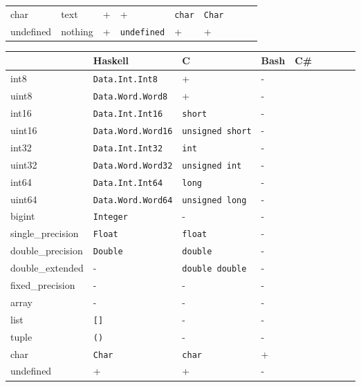 \documentclass[../main]{subfiles}
\begin{document}
\begin{table}
\begin{wide}
\begin{tabular}{|l|l|l|l|l|l|l|l|l|}
            char & text & + & + & \texttt{char} & \texttt{Char} \\
            undefined & nothing & + & \texttt{undefined} & + & + \\
            \hline
        \end{tabular}
        \begin{tabular}{|l|l|l|l|l|l|l|l|l|}
            \hline
            \tested{}         & Haskell                   & C                        & Bash & C\# \\
            \hline
            int8              & \texttt{Data.Int.Int8}    & +                        & -    & \\
            uint8             & \texttt{Data.Word.Word8}  & +                        & -    & \\
            int16             & \texttt{Data.Int.Int16}   & \texttt{short}           & -    & \\
            uint16            & \texttt{Data.Word.Word16} & \texttt{unsigned\ short} & -    & \\
            int32             & \texttt{Data.Int.Int32}   & \texttt{int}             & -    & \\
            uint32            & \texttt{Data.Word.Word32} & \texttt{unsigned\ int}   & -    & \\
            int64             & \texttt{Data.Int.Int64}   & \texttt{long}            & -    & \\
            uint64            & \texttt{Data.Word.Word64} & \texttt{unsigned\ long}  & -    & \\
            bigint            & \texttt{Integer}          & -                        & -    & \\
            single\_precision & \texttt{Float}            & \texttt{float}           & -    & \\
            double\_precision & \texttt{Double}           & \texttt{double}          & -    & \\
            double\_extended  & -                         & \texttt{double\ double}  & -    & \\
            fixed\_precision  & -                         & -                        & -    & \\
            array             & -                         & -                        & -    & \\
            list              & \texttt{{[}{]}}           & -                        & -    & \\
            tuple             & \texttt{()}               & -                        & -    & \\
            char              & \texttt{Char}             & \texttt{char}            & +    & \\
            undefined         & +                         & +                        & -    & \\
            \hline
        \end{tabular}
    \end{wide}
    \label{tab:tested-advanced-types}
\end{table}
\end{document}
